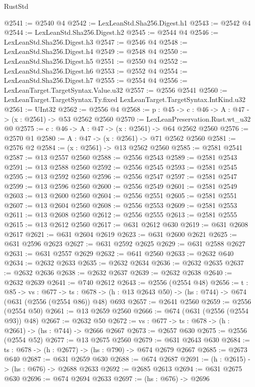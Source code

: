 \begin{lexlean}{RustStd}
\begin{coremodule}
@2541 := @2540 @4
@2542 := LexLeanStd.Sha256.Digest.h1
@2543 := @2542 @4
@2544 := LexLeanStd.Sha256.Digest.h2
@2545 := @2544 @4
@2546 := LexLeanStd.Sha256.Digest.h3
@2547 := @2546 @4
@2548 := LexLeanStd.Sha256.Digest.h4
@2549 := @2548 @4
@2550 := LexLeanStd.Sha256.Digest.h5
@2551 := @2550 @4
@2552 := LexLeanStd.Sha256.Digest.h6
@2553 := @2552 @4
@2554 := LexLeanStd.Sha256.Digest.h7
@2555 := @2554 @4
@2556 := LexLeanTarget.TargetSyntax.Value.u32
@2557 := @2556 @2541
@2560 := LexLeanTarget.TargetSyntax.Ty.fixed LexLeanTarget.TargetSyntax.IntKind.u32
@2561 := UInt32
@2562 := @2556 @4
@2568 := {p : @45} -> {c : @46} -> {A : @47} -> (x : @2561) -> @53 @2562 @2560
@2570 := LexLeanPreservation.Rust.wt_u32 @0
@2575 := {c : @46} -> {A : @47} -> (x : @2561) -> @64 @2562 @2560
@2576 := @2570 @1
@2580 := {A : @47} -> (x : @2561) -> @71 @2562 @2560
@2581 := @2576 @2
@2584 := (x : @2561) -> @13 @2562 @2560
@2585 := @2581 @2541
@2587 := @13 @2557 @2560
@2588 := @2556 @2543
@2589 := @2581 @2543
@2591 := @13 @2588 @2560
@2592 := @2556 @2545
@2593 := @2581 @2545
@2595 := @13 @2592 @2560
@2596 := @2556 @2547
@2597 := @2581 @2547
@2599 := @13 @2596 @2560
@2600 := @2556 @2549
@2601 := @2581 @2549
@2603 := @13 @2600 @2560
@2604 := @2556 @2551
@2605 := @2581 @2551
@2607 := @13 @2604 @2560
@2608 := @2556 @2553
@2609 := @2581 @2553
@2611 := @13 @2608 @2560
@2612 := @2556 @2555
@2613 := @2581 @2555
@2615 := @13 @2612 @2560
@2617 := @631 @2612 @630
@2619 := @631 @2608 @2617
@2621 := @631 @2604 @2619
@2623 := @631 @2600 @2621
@2625 := @631 @2596 @2623
@2627 := @631 @2592 @2625
@2629 := @631 @2588 @2627
@2631 := @631 @2557 @2629
@2632 := @641 @2560
@2633 := @2632 @640
@2634 := @2632 @2633
@2635 := @2632 @2634
@2636 := @2632 @2635
@2637 := @2632 @2636
@2638 := @2632 @2637
@2639 := @2632 @2638
@2640 := @2632 @2639
@2641 := @740 @2612
@2643 := @2556 (@2554 @48)
@2656 := {t : @85} ->
  {vs : @677} ->
  {ts : @678} -> (h : @13 @2643 @50) -> (hs : @744) -> @674 (@631 (@2556 (@2554 @86)) @48) @693
@2657 := @2641 @2560
@2659 := @2556 (@2554 @50)
@2661 := @13 @2659 @2560
@2666 := @674 (@631 (@2556 (@2554 @93)) @48)
@2667 := @2632 @50
@2672 := {vs : @677} -> {ts : @678} -> (h : @2661) -> (hs : @744) -> @2666 @2667
@2673 := @2657 @630
@2675 := @2556 (@2554 @52)
@2677 := @13 @2675 @2560
@2679 := @631 @2643 @630
@2684 := {ts : @678} -> (h : @2677) -> (hs : @790) -> @674 @2679 @2667
@2685 := @2673 @640
@2687 := @631 @2659 @630
@2688 := @674 @2687
@2691 := (h : @2615) -> (hs : @676) -> @2688 @2633
@2692 := @2685 @2613
@2694 := @631 @2675 @630
@2696 := @674 @2694 @2633
@2697 := (hs : @676) -> @2696

\end{coremodule}
\end{lexlean}
